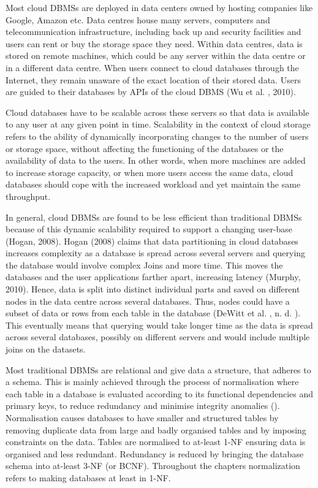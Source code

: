 Most cloud \acp{DBMS} are deployed in data centers owned by hosting companies
like Google,   Amazon etc.  Data centres house many servers,   computers and
telecommunication infrastructure,   including back up and security facilities and
users can rent or buy the storage space they need.  Within data centres,   data
is stored on remote machines,   which could be any server within the data
centre or in a different data centre.  When users connect to cloud databases
through the Internet,   they remain unaware of the exact location of their stored
data.   Users are guided to their databases by \acp{API} of the cloud \ac{DBMS}
(Wu et al. ,   2010). 

Cloud databases have to be scalable across these servers so that data is
available to any user at any given point in time.  Scalability in the context of
cloud storage refers to the ability of dynamically incorporating changes to the
number of users or storage space,   without affecting the functioning of the
databases or the availability of data to the users.  In other words,   when more
machines are added to increase storage capacity,   or when more users access the
same data,   cloud databases should cope with the increased workload and yet
maintain the same throughput. 

In general,   cloud \acp{DBMS} are found to be less efficient than traditional
\acp{DBMS} because of this dynamic scalability required to
support a changing user-base (Hogan,   2008).  Hogan (2008) claims that data
partitioning in cloud databases increases complexity as a database is spread
across several servers and querying the database would involve complex Joins and
more time.  This moves the databases and the user applications farther apart,  
increasing latency (Murphy,   2010).  Hence,   data is split into distinct individual
parts and saved on different nodes in the data centre across several databases. 
Thus,   nodes could have a subset of data or rows from each table in the database
(DeWitt et al. ,   n. d. ). This eventually means that querying would take longer time
as the data is spread across several databases,   possibly on different servers
and would include multiple joins on the datasets. 

Most traditional \acp{DBMS} are relational and give data a structure,   that
adheres to a schema.  This is mainly achieved through the process of
normalisation where each table in a database is evaluated according to its functional dependencies
and primary keys,   to reduce redundancy and minimise integrity anomalies
().  Normalisation causes databases to have smaller and
structured tables by removing duplicate data from large and badly organised
tables and by imposing constraints on the data.  Tables are normalised to
at-least \ac{1-NF} ensuring data is organised and less redundant. Redundancy is
reduced by bringing the database schema into at-least \ac{3-NF} (or \ac{BCNF}).
Throughout the chapters normalization refers to making databases at least in \ac{1-NF}.

